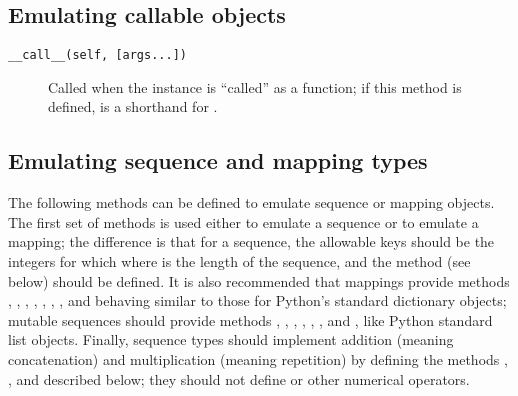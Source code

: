 \subsection{Emulating callable objects\label{callable-types}}

\begin{description}

\item[{\tt __call__(self, [args...])}]
Called when the instance is ``called'' as a function; if this method
is defined,  is a shorthand for
.

\end{description}


\subsection{Emulating sequence and mapping types\label{sequence-types}}

The following methods can be defined to emulate sequence or mapping
objects.  The first set of methods is used either to emulate a
sequence or to emulate a mapping; the difference is that for a
sequence, the allowable keys should be the integers  for which
 where  is the length of the
sequence, and the method  (see below) should be
defined.  It is also recommended that mappings provide methods
, , ,
, , , ,
 and  behaving similar to those for
Python's standard dictionary objects; mutable sequences should provide
methods , , ,
, , , 
and , like Python standard list objects.  Finally,
sequence types should implement addition (meaning concatenation) and
multiplication (meaning repetition) by defining the methods
, ,  and
 described below; they should not define
 or other numerical operators.

